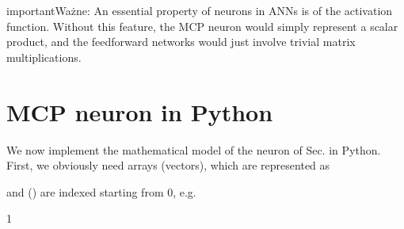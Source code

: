 \documentclass[a4paper,12pt,polish]{jupyterBook}
\begin{document}
\begin{sphinxadmonition}{important}{Ważne:}
\sphinxAtStartPar
An essential property of neurons in ANNs is  of the activation function. Without this feature, the MCP neuron would simply represent a scalar product, and the feed\sphinxhyphen{}forward networks would just involve trivial matrix multiplications.
\end{sphinxadmonition}


\section{MCP neuron in Python}
\label{\detokenize{docs/mcp:mcp-neuron-in-python}}\label{\detokenize{docs/mcp:mcp-p-lab}}
\sphinxAtStartPar
We now implement the mathematical model of the neuron of Sec. {\hyperref[\detokenize{docs/mcp:mcp-lab}]{}} in Python. First, we obviously need arrays (vectors), which are represented as
\begin{sphinxVerbatimInput}

\begin{sphinxVerbatim}[commandchars=\\\{\}]
  \PYG{p}{[}\PYG{p}{]}
  \PYG{p}{[}\PYG{p}{]}
\end{sphinxVerbatim}
\end{sphinxVerbatimInput}

\sphinxAtStartPar
and () are indexed starting from 0, e.g.
\begin{sphinxVerbatimInput}

\begin{sphinxVerbatim}[commandchars=\\\{\}]
\PYG{p}{[}\PYG{p}{]}
\end{sphinxVerbatim}
\end{sphinxVerbatimInput}
\begin{sphinxVerbatimOutput}

\begin{sphinxVerbatim}[commandchars=\\\{\}]
1
\end{sphinxVerbatim}
\end{sphinxVerbatimOutput}
\end{document}
